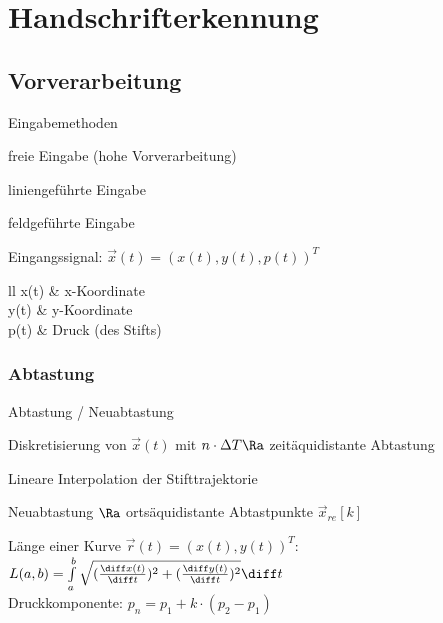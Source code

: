 \documentclass[german,color,6pt]{latex4ei/latex4ei_sheet}
\begin{document}
\section{Handschrifterkennung}

\begin{sectionbox}
	\subsection{Vorverarbeitung}
		\begin{cookbox}{Eingabemethoden}
			\item freie Eingabe (hohe Vorverarbeitung)
			\item liniengeführte Eingabe
			\item feldgeführte Eingabe
		\end{cookbox}
	Eingangssignal: $\vec x(t) = (x(t), y(t), p(t))^T$\\
	\begin{tablebox}{ll}
		x(t) & x-Koordinate\\
		y(t) & y-Koordinate\\
		p(t) & Druck (des Stifts)\\
	\end{tablebox}
\end{sectionbox}

\begin{sectionbox}
	\subsubsection{Abtastung}
		\begin{cookbox}{Abtastung / Neuabtastung}
			\item Diskretisierung von $\vec x(t)$ mit $n \cdot \Delta T \Ra $ zeitäquidistante Abtastung
			\item Lineare Interpolation der Stifttrajektorie
			\item Neuabtastung $\Ra$ ortsäquidistante Abtastpunkte $\vec x_{re}[k]$
		\end{cookbox}

		Länge einer Kurve $\vec r(t) = (x(t),y(t))^T$:\\
		$L(a,b) = \int \limits_a^b \sqrt{(\frac{\diff x(t)}{\diff t})^2 + (\frac{\diff y(t)}{\diff t})^2} \diff t$\\

		Druckkomponente: $p_n = p_1 + k\cdot(p_2 - p_1)$
\end{sectionbox}
\end{document}
